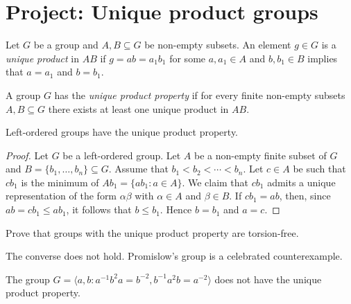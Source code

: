 \section{Project: Unique product groups}
\label{section:UP}

Let $G$ be a group and $A,B\subseteq G$ be non-empty subsets. 
An element $g\in G$ is a \emph{unique product} in $AB$ if $g=ab=a_1b_1$ for some
$a,a_1\in
A$ and $b,b_1\in B$ implies that $a=a_1$ and $b=b_1$.

\begin{definition}
	A group $G$ has the \emph{unique product property} if 
	for every finite non-empty subsets $A,B\subseteq G$ there exists at least one
	unique product in $AB$.
\end{definition}

\begin{proposition}
    Left-ordered groups have the unique product property.
\end{proposition}

\begin{proof}
    Let $G$ be a left-ordered group. 
	Let $A$ be a non-empty finite subset of $G$ and $B=\{b_1,\dots,b_n\}\subseteq G$. 
	Assume that $b_1<b_2<\cdots<b_n$. Let $c\in A$ be such that $cb_1$ is the 
	minimum of $Ab_1=\{ab_1:a\in A\}$. We claim that $cb_1$ admits a unique
	representation of the form $\alpha\beta$ with $\alpha\in A$ and 
	$\beta\in B$. If $cb_1=ab$, then, since $ab=cb_1\leq ab_1$, it follows that 
	$b\leq b_1$. Hence $b=b_1$ and $a=c$. 
\end{proof}

\begin{exercise}
	Prove that groups with the unique product property are
	torsion-free.
\end{exercise}

The converse does not hold. 
Promislow's group is a celebrated counterexample.

\begin{theorem}[Promislow]
    The group $G=\langle a,b:a^{-1}b^2a=b^{-2},b^{-1}a^2b=a^{-2}\rangle$
    does not have the unique product property.
\end{theorem}

